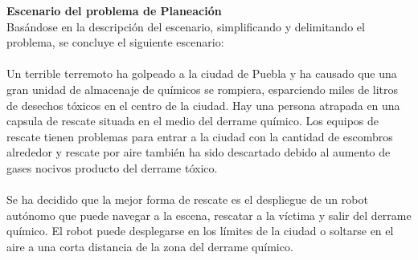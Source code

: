 \documentclass[letterpaper ,10pt]{article}
\begin{document}
{{\medskip
{\LARGE \textbf{ Escenario del problema de Planeación}}
\medskip
\\
Basándose en la descripción del escenario, simplificando y delimitando el problema, se concluye el siguiente escenario:\\
\\
Un terrible terremoto ha golpeado a la ciudad de Puebla y ha causado que una gran unidad de almacenaje de químicos se rompiera, esparciendo miles de litros de desechos tóxicos en el centro de la ciudad. Hay una persona atrapada en una capsula de rescate situada en el medio del derrame químico. Los equipos de rescate tienen problemas para entrar a la ciudad con la cantidad de escombros alrededor y rescate por aire también ha sido descartado debido al aumento de gases nocivos producto del derrame tóxico.\\
\\
Se ha decidido que la mejor forma de rescate es el despliegue de un robot autónomo que puede navegar a la escena, rescatar a la víctima y salir del derrame químico. El robot puede desplegarse en los límites de la ciudad o soltarse en el aire a una corta distancia de la zona del derrame químico. 

}}
\end{document}
